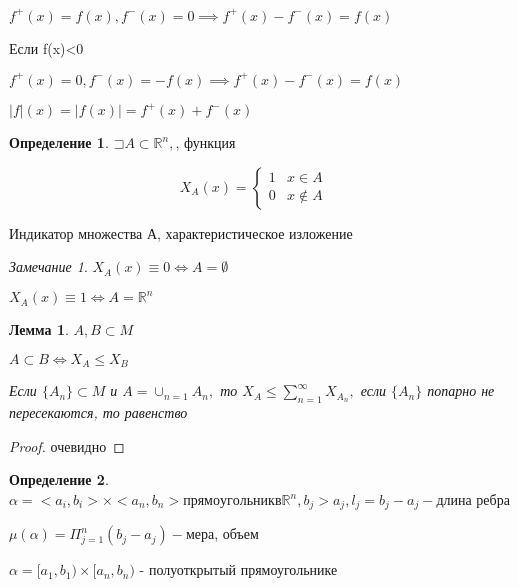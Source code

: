 \documentclass[a4paper]{article}
\newcommand\letsymbol{\mathord{\sqsupset}}
\newtheorem{lemma}{Лемма}[section]
\theoremstyle{definition}
\newtheorem*{definition}{Определение}
\theoremstyle{remark}
\newtheorem*{remark}{Замечание}
\begin{document}
$f^{+}(x) = f(x), f^{-}(x) = 0\implies f^{+}(x) - f^{-}(x) = f(x)$

Если f(x)<0

$f^{+}(x) = 0, f^{-}(x) = -f(x)\implies f^{+}(x) -f^{-}(x) = f(x)$

$|f|(x) = |f(x)| = f^{+}(x) + f^{-}(x)$

\begin{definition}
     $\letsymbol A\subset \mathbb{R}^n, $, функция

     
     \begin{equation*}
          X_A(x) = 
           \begin{cases}
             1 &\text{$x\in A\quad$} \\
             0 &\text{$x \notin A\quad$}
           \end{cases}
     \end{equation*}

Индикатор множества А, характеристическое изложение
\end{definition}
\begin{remark}
     $X_A(x)\equiv 0\Leftrightarrow A=\emptyset$

     $X_A(x)\equiv 1\Leftrightarrow A=\mathbb{R}^n $
\end{remark}
\begin{lemma}
     $A, B\subset M$
     
     $A\subset B \Leftrightarrow X_A \leq X_B$

     Если $\{A_n\}\subset M$ и $A ={\cup}_{n=1}A_n,$ то $X_A\leq \sum_{n = 1}^{\infty} X_{A_n},$ если $\{A_n\}$
     попарно не пересекаются, то равенство
\end{lemma}

\begin{proof}
     очевидно
\end{proof}

     \begin{definition}
          $\alpha = <a_i, b_i> \times <a_n, b_n> прямоугольник в \mathbb{R}^n, b_j>a_j, l_j = b_j - a_j - $длина ребра 
     \end{definition}
     $\mu(\alpha) = \Pi_{j=1}^n (b_j - a_j) -$мера, объем

     $\alpha =[a_1, b_1)\times[a_n, b_n)$ - полуоткрытый прямоугольнике
\end{document}
